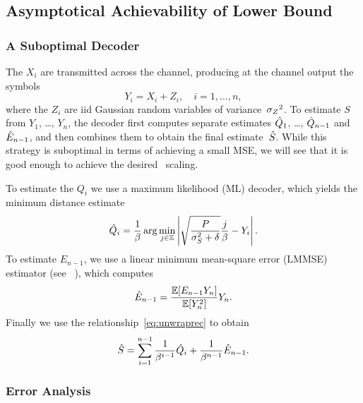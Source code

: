 \subsection{Asymptotical Achievability of Lower Bound}
\label{sec:achievable}

\subsubsection{A Suboptimal Decoder}

The $X_i$ are transmitted across the channel, producing at the channel output
the symbols
\begin{equation*}
  Y_i = X_i + Z_i, \quad i = 1, \dots, n,
\end{equation*}
where the $Z_i$ are iid Gaussian random variables of variance~${{\sigma_Z}^2}$. 
To estimate $S$ from  $Y_1$, \dots, $Y_n$, the decoder first
computes separate estimates $\hat{Q}_1$, \dots, $\hat{Q}_{n-1}$ and $\hat{E}_{n-1}$, and
then combines them to obtain the final estimate~${\hat{S}}$.  While this strategy is
suboptimal in terms of achieving a small MSE, we will see that it is good enough
to achieve the desired \sdr\ scaling.

To estimate the $Q_i$ we use a maximum likelihood (ML) decoder, which yields the
minimum distance estimate
\begin{equation}
  \label{eq:mldecoder}
  \hat{Q}_i = \frac{1}{\beta} \arg \min_{j\in \mathbb{Z}} \left| \sqrt{\frac{P}{{\sigma_S^2}
  + \delta} } \frac{j}{\beta} - Y_i \right|.
\end{equation}
To estimate $E_{n-1}$, we use a linear minimum mean-square error (LMMSE)
estimator (see \eg~\cite[Section~8.3]{Scharf1990}), which computes
\begin{equation}
  \label{eq:lmmse}
  \hat{E}_{n-1} = \frac{\mathbb{E}[E_{n-1} Y_n]}{\mathbb{E}[Y_n^2]} Y_n.
\end{equation}
Finally we use the relationship~\eqref{eq:unwraprec} to obtain
\begin{equation}
  \label{eq:unwrapestim}
  {\hat{S}} = \sum_{i=1}^{n-1} \frac{1}{\beta^{i-1}} \hat{Q}_i + \frac{1}{\beta^{n-1}}
  \hat{E}_{n-1}.
\end{equation}


\subsubsection{Error Analysis}

